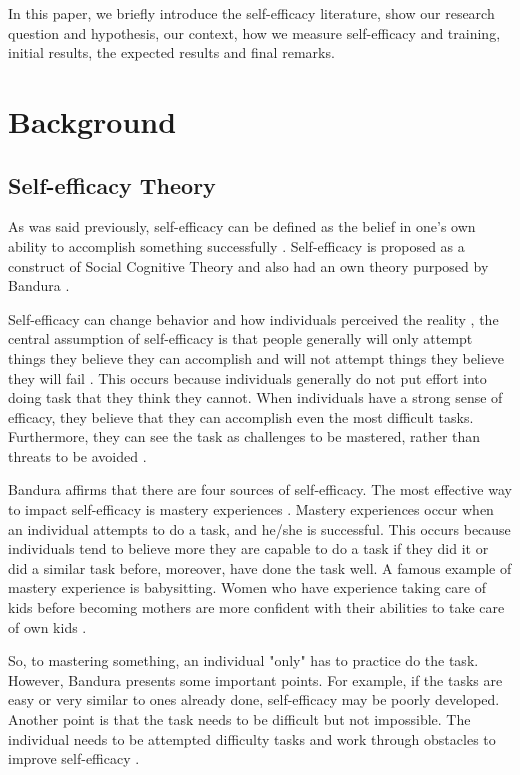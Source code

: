 \documentclass[10pt, conference]{IEEEtran}
\begin{document}
In this paper, we briefly introduce the self-efficacy literature, show our research question and hypothesis, our context, how we measure self-efficacy and training, initial results, the expected results and final remarks.


\section{Background}
\label{background}

\subsection{Self-efficacy Theory}
As was said previously, self-efficacy can be defined as the belief in one's own ability to accomplish something successfully  \cite{bandura1977self}. Self-efficacy is proposed as a construct of Social Cognitive Theory \cite{bandura1977social} and also had an own theory purposed by Bandura \cite{bandura1977self}. 

Self-efficacy can change behavior and how individuals perceived the reality \cite{bandura2010self}, the central assumption of self-efficacy is that people generally will only attempt things they believe they can accomplish and will not attempt things they believe they will fail \cite{bandura1977self}. This occurs because individuals generally do not put effort into doing task that they think they cannot. When individuals have a strong sense of efficacy, they believe that they can accomplish even the most difficult tasks. Furthermore, they can see the task as challenges to be mastered, rather than threats to be avoided \cite{bandura1994ramachaudran}.

Bandura affirms that there are four sources of self-efficacy. The most effective way to impact self-efficacy is mastery experiences \cite{bandura1994ramachaudran}. Mastery experiences occur when an individual attempts to do a task, and he/she is successful. This occurs because individuals tend to believe more they are capable to do a task if they did it or did a similar task before,  moreover, have done the task well. A famous example of mastery experience is babysitting. Women who have experience taking care of kids before becoming mothers are more confident with their abilities to take care of own kids \cite{froman1989infant}.

So, to mastering something, an individual "only" has to practice do the task. However, Bandura \cite{bandura1994ramachaudran} presents some important points. For example, if the tasks are easy or very similar to ones already done, self-efficacy may be poorly developed. Another point is that the task needs to be difficult but not impossible. The individual needs to be attempted difficulty tasks and work through obstacles to improve self-efficacy \cite{bandura2010self}. 
\end{document}
